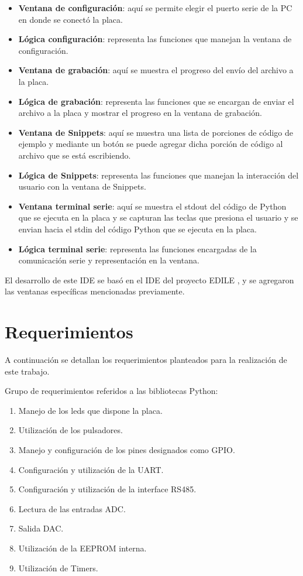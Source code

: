 \begin{itemize}
	\item \textbf{Ventana de configuración}: aquí se permite elegir el puerto serie de la PC en donde se conectó la placa.
	\item \textbf{Lógica configuración}: representa las funciones que manejan la ventana de configuración.
	\item \textbf{Ventana de grabación}: aquí se muestra el progreso del envío del archivo a la placa.
	\item \textbf{Lógica de grabación}: representa las funciones que se encargan de enviar el archivo a la placa y mostrar el progreso en la ventana de grabación.
	\item \textbf{Ventana de Snippets}: aquí se muestra una lista de porciones de código de ejemplo y mediante un botón se puede agregar dicha porción de código al archivo que se está escribiendo.
	\item \textbf{Lógica de Snippets}: representa las funciones que manejan la interacción del usuario con la ventana de Snippets.
	\item \textbf{Ventana terminal serie}: aquí se muestra el stdout del código de Python que se ejecuta en la placa y se capturan las teclas que presiona el usuario y se envian hacia el stdin del código Python que se ejecuta en la placa.
	\item \textbf{Lógica terminal serie}: representa las funciones encargadas de la comunicación serie y representación en la ventana.
\end{itemize}
	
El desarrollo de este IDE se basó en el IDE del proyecto EDILE \cite{edile}, y se agregaron las ventanas específicas mencionadas previamente.







\section{Requerimientos}
\label{sec:req}

A continuación se detallan los requerimientos planteados para la realización de este trabajo.

Grupo de requerimientos referidos a las bibliotecas Python:
\begin{enumerate}
	\item  Manejo de los leds que dispone la placa.
	\item  Utilización de los pulsadores.
	\item  Manejo y configuración de los pines designados como GPIO. 
	\item  Configuración y utilización de la UART.
	\item  Configuración y utilización de la interface RS485.
	\item  Lectura de las entradas ADC.
	\item  Salida DAC.
	\item  Utilización de la EEPROM interna.
	\item  Utilización de Timers.
\end{enumerate}

